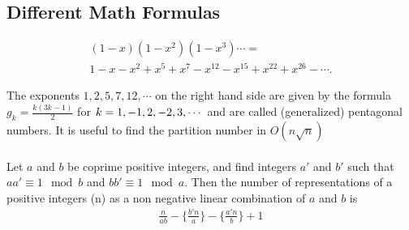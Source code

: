 \documentclass[10pt,a4paper,onesided]{article}
\begin{document}
\begin{multicols*}{2}
\subsection{Different Math Formulas}
\begin{multline*}
\displaystyle (1 - x)(1 - x ^ 2)(1 - x^3)\cdots = \\ 1 - x - x^2 + x^5 + x^7 - x^{12} - x^{15} + x^{22} + x^{26} - \cdots.
\end{multline*}

The exponents $\displaystyle 1, 2, 5, 7, 12,\cdots$ on the right hand side are given by the formula $g_k = \frac{k(3k - 1)}{2}$ for $\displaystyle \displaystyle k = 1, -1, 2, -2, 3, \cdots$ and are called (generalized) pentagonal numbers.
It is useful to find the partition number in $O(n \sqrt{n})$ \\ \\
Let $\displaystyle a$ and $b$ be coprime positive integers, and find integers $\displaystyle a{\prime}$ and $b{\prime}$ such that $\displaystyle aa{\prime} \equiv 1 \mod b$ and $bb{\prime} \equiv 1 \mod a$. Then the number of representations of a positive integers (n) as a non negative linear combination of $\displaystyle a$ and $b$ is 
\begin{multline*}
\displaystyle \frac{n}{ab}-\Big\{\frac{b{\prime} n}{a}\Big\}-\Big\{\frac{a{\prime} n}{b}\Big\} + 1
\end{multline*}

\end{multicols*}
\end{document}
